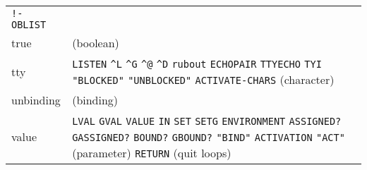 \documentclass[a4paper]{scrbook}
\begin{document}
\begin{longtable}[]{@{}ll@{}}
\begin{minipage}[t]{0.83\columnwidth}
\texttt{!-} \texttt{OBLIST}\strut
\end{minipage}\tabularnewline
\begin{minipage}[t]{0.11\columnwidth}\raggedright\strut
true\strut
\end{minipage} & \begin{minipage}[t]{0.83\columnwidth}\raggedright\strut
(boolean)\strut
\end{minipage}\tabularnewline
\begin{minipage}[t]{0.11\columnwidth}\raggedright\strut
tty\strut
\end{minipage} & \begin{minipage}[t]{0.83\columnwidth}\raggedright\strut
\texttt{LISTEN} \texttt{\^{}L} \texttt{\^{}G} \texttt{\^{}@} \texttt{\^{}D} \texttt{rubout} \texttt{ECHOPAIR}
\texttt{TTYECHO} \texttt{TYI} \texttt{"BLOCKED"} \texttt{"UNBLOCKED"} \texttt{ACTIVATE-CHARS} (character)\strut
\end{minipage}\tabularnewline
\begin{minipage}[t]{0.11\columnwidth}\raggedright\strut
unbinding\strut
\end{minipage} & \begin{minipage}[t]{0.83\columnwidth}\raggedright\strut
(binding)\strut
\end{minipage}\tabularnewline
\begin{minipage}[t]{0.11\columnwidth}\raggedright\strut
value\strut
\end{minipage} & \begin{minipage}[t]{0.83\columnwidth}\raggedright\strut
\texttt{LVAL} \texttt{GVAL} \texttt{VALUE} \texttt{IN} \texttt{SET} \texttt{SETG} \texttt{ENVIRONMENT} \texttt{ASSIGNED?}
\texttt{GASSIGNED?} \texttt{BOUND?} \texttt{GBOUND?} \texttt{"BIND"} \texttt{ACTIVATION} \texttt{"ACT"} (parameter)
\texttt{RETURN} (quit loops)\strut
\end{minipage}\tabularnewline
\bottomrule
\end{longtable}


\printindex
\clearpage
\end{document}
